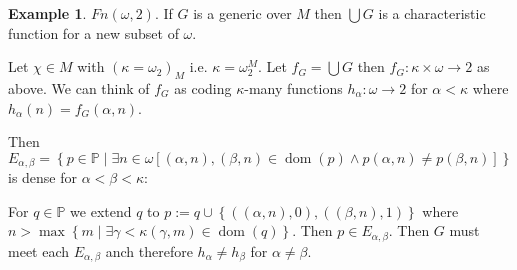 \documentclass{scrartcl}
\newcommand{\set}[1]{\left\{#1\right\}}
\DeclareMathOperator{\dom}{dom}
\theoremstyle{definition}
\newtheorem*{example*}{Example}
\theoremstyle{plain}
\theoremstyle{remark}
\begin{document}
	\begin{example*}
		$Fn(\omega, 2)$. If $G$ is a generic over $M$ then $\bigcup G$ is a characteristic
		function for a new subset of $\omega$.

		Let $\chi \in M$ with $(\kappa = \omega_2)_M$ i.e. $\kappa = \omega_2^M$.
		Let $f_G = \bigcup G$ then $f_G : \kappa \times \omega \to 2$ as
		above. We can think of $f_G$ as coding $\kappa$-many functions $h_\alpha:\omega \to 2$
		for $\alpha < \kappa$ where $h_\alpha(n) = f_G(\alpha, n)$.

		Then $E_{\alpha, \beta} = \set{p \in \mathbb{P} \mid \exists n \in \omega [
		(\alpha, n), (\beta, n) \in \dom(p) \land p(\alpha, n) \neq p(\beta, n)]}$
		is dense for $\alpha < \beta < \kappa$:
		
		For $q \in \mathbb{P}$ we extend $q$ to $p := q \cup \set{((\alpha, n), 0), 
		((\beta, n), 1)}$ where $n > \max\set{m \mid \exists \gamma < \kappa (\gamma, m)
		\in \dom(q)}$. Then $p \in E_{\alpha, \beta}$. Then
		$G$ must meet each $E_{\alpha, \beta}$ anch therefore $h_\alpha \neq h_\beta$
		for $\alpha \neq \beta$.
	\end{example*}
\end{document}
